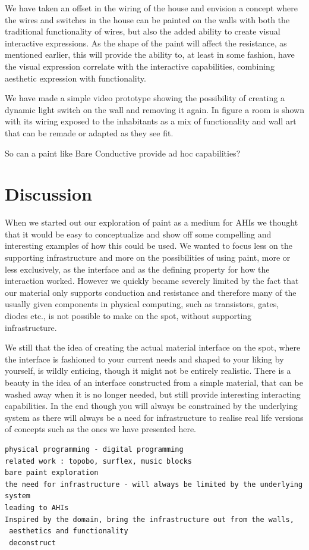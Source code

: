 We have taken an offset in the wiring of the house and envision a concept where the wires and switches in the house can be painted on the walls with both the traditional functionality of wires, but also the added ability to create visual interactive expressions.
As the shape of the paint will affect the resistance, as mentioned earlier, this will provide the ability to, at least in some fashion, have the visual expression correlate with the interactive capabilities, combining aesthetic expression with functionality.

We have made a simple video prototype showing the possibility of creating a dynamic light switch on the wall and removing it again.
In figure  a room is shown with its wiring exposed to the inhabitants as a mix of functionality and wall art that can be remade or adapted as they see fit.

So can a paint like Bare Conductive provide ad hoc capabilities?

\section{Discussion}
When we started out our exploration of paint as a medium for AHIs we thought that it would be easy to conceptualize and show off some compelling and interesting examples of how this could be used.
We wanted to focus less on the supporting infrastructure and more on the possibilities of using paint, more or less exclusively, as the interface and as the defining property for how the interaction worked. 
However we quickly became severely limited by the fact that our material only supports conduction and resistance and therefore many of the usually given components in physical computing, such as transistors, gates, diodes etc., is not possible to make on the spot, without supporting infrastructure.  


We still  that the idea of creating the actual material interface on the spot, where the interface is fashioned to your current needs and shaped to your liking by yourself, is wildly enticing, though it might not be entirely realistic.
There is a beauty in the idea of an interface constructed from a simple material, that can be washed away when it is no longer needed, but still provide interesting interacting capabilities.
In the end though you will always be constrained by the underlying system as there will always be a need for infrastructure to realise real life versions of concepts such as the ones we have presented here.

\begin{verbatim}
physical programming - digital programming
related work : topobo, surflex, music blocks
bare paint exploration
the need for infrastructure - will always be limited by the underlying system
leading to AHIs
Inspired by the domain, bring the infrastructure out from the walls,
 aesthetics and functionality
 deconstruct
\end{verbatim}